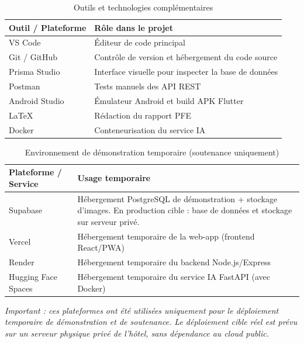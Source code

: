 
\begin{table}[H]
\centering
\caption{Outils et technologies complémentaires}
\label{tab:tech_complementaires}
\begin{tabular}{|l|p{10cm}|}
\hline
\textbf{Outil / Plateforme} & \textbf{Rôle dans le projet} \\
\hline
VS Code & Éditeur de code principal \\
\hline
Git / GitHub & Contrôle de version et hébergement du code source \\
\hline
Prisma Studio & Interface visuelle pour inspecter la base de données \\
\hline
Postman & Tests manuels des API REST \\
\hline
Android Studio & Émulateur Android et build APK Flutter \\
\hline
\LaTeX & Rédaction du rapport PFE \\
\hline
Docker & Conteneurisation du service IA \\
\hline
\end{tabular}
\end{table}

\begin{table}[H]
\centering
\caption{Environnement de démonstration temporaire (soutenance uniquement)}
\label{tab:demo_platforms}
\begin{tabular}{|l|p{9cm}|}
\hline
\textbf{Plateforme / Service} & \textbf{Usage temporaire} \\
\hline
Supabase & Hébergement PostgreSQL de démonstration + stockage d'images. En production cible : base de données et stockage sur serveur privé. \\
\hline
Vercel & Hébergement temporaire de la web-app (frontend React/PWA) \\
\hline
Render & Hébergement temporaire du backend Node.js/Express \\
\hline
Hugging Face Spaces & Hébergement temporaire du service IA FastAPI (avec Docker) \\
\hline
\end{tabular}
\end{table}

\noindent\textit{Important : ces plateformes ont été utilisées uniquement pour le déploiement temporaire de démonstration et de soutenance. Le déploiement cible réel est prévu sur un serveur physique privé de l'hôtel, sans dépendance au cloud public.}
